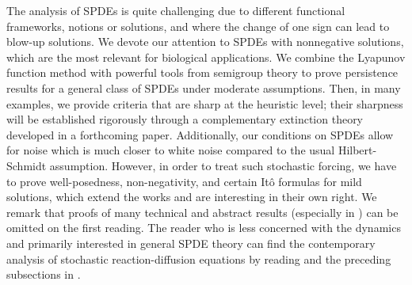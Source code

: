 \documentclass[final]{amsart}
\numberwithin{thm}{section}
\numberwithin{equation}{section}
\begin{document}
The analysis of SPDEs is quite challenging due to different functional frameworks, notions or solutions, and where the change of one sign can lead to blow-up solutions. 
We devote our attention to SPDEs with
nonnegative solutions, which are the most relevant for biological applications. We combine the Lyapunov function method with powerful tools from semigroup theory to prove 
persistence results for a general class of SPDEs under moderate assumptions. Then, in many examples, we provide criteria that are sharp at the heuristic level; their sharpness will be established rigorously through a complementary extinction theory developed in a forthcoming paper.
 Additionally, our conditions on SPDEs allow for noise which is much closer to white noise compared to the usual Hilbert-Schmidt assumption.  However, in order to treat such stochastic forcing,  we have to prove  well-posedness, non-negativity, and certain It\^{o} formulas for mild solutions, which extend the works  \cite{Cerrai2003, nhu-positivity, feller-stoch-reac-diff} and are 
interesting in their own right. We remark that proofs of many technical and abstract results (especially in ) can be omitted on the first reading. The reader who is less concerned with the dynamics and primarily interested in general SPDE theory can find the contemporary analysis of stochastic reaction-diffusion equations by reading  and the preceding subsections in . 
\end{document}
